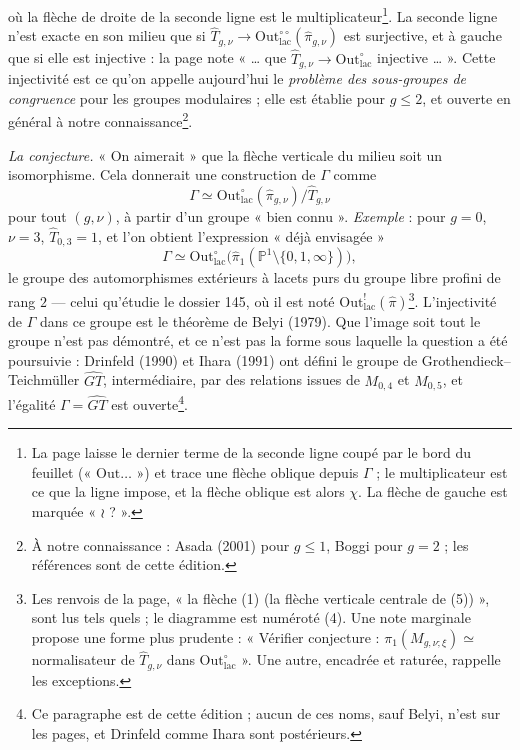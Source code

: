 \documentclass[11pt,a4paper]{article}
\begin{document}
où la flèche de droite de la seconde ligne est le multiplicateur\footnote{La
page laisse le dernier terme de la seconde ligne coupé par le bord du
feuillet (« $\mathrm{Out}\ldots$ ») et trace une flèche oblique depuis $\Gamma$ ;
le multiplicateur est ce que la ligne impose, et la flèche oblique est alors
$\chi$. La flèche de gauche est marquée « $\wr$ ? ».}. La seconde ligne n'est
exacte en son milieu que si $\widehat T_{g,\nu} \to
\mathrm{Out}^{\circ\circ}_{\mathrm{lac}}(\widehat\pi_{g,\nu})$ est surjective, et
à gauche que si elle est injective : la page note « … que $\widehat T_{g,\nu}
\to \mathrm{Out}^{\circ}_{\mathrm{lac}}$ injective … ». Cette injectivité est
ce qu'on appelle aujourd'hui le \emph{problème des sous-groupes de congruence}
pour les groupes modulaires ; elle est établie pour $g \leq 2$, et ouverte en
général à notre connaissance\footnote{À notre connaissance : Asada (2001) pour $g \leq 1$, Boggi pour
$g = 2$ ; les références sont de cette édition.}.

\emph{La conjecture.} « On aimerait » que la flèche verticale du milieu soit un
isomorphisme. Cela donnerait une construction de $\Gamma$ comme
\[
\Gamma \simeq \mathrm{Out}^{\circ}_{\mathrm{lac}}(\widehat\pi_{g,\nu}) \big/
\widehat T_{g,\nu}
\]
pour tout $(g, \nu)$, à partir d'un groupe « bien connu ». \emph{Exemple} : pour
$g = 0$, $\nu = 3$, $\widehat T_{0,3} = 1$, et l'on obtient l'expression « déjà
envisagée »
\[
\Gamma \simeq \mathrm{Out}^{\circ}_{\mathrm{lac}}\bigl(\widehat\pi_1(\mathbb{P}^1
\setminus \{0, 1, \infty\})\bigr),
\]
le groupe des automorphismes extérieurs à lacets purs du groupe libre profini
de rang $2$ — celui qu'étudie le dossier 145, où il est noté
$\mathrm{Out}^{!}_{\mathrm{lac}}(\widehat\pi)$\footnote{Les renvois de la page,
« la flèche (1) (la flèche verticale centrale de (5)) », sont lus tels quels ;
le diagramme est numéroté (4). Une note marginale propose une forme plus
prudente : « Vérifier conjecture : $\pi_1(M_{g,\nu;\xi}) \simeq$ normalisateur de
$\widehat T_{g,\nu}$ dans $\mathrm{Out}^{\circ}_{\mathrm{lac}}$ ». Une autre,
encadrée et raturée, rappelle les exceptions.}. L'injectivité de $\Gamma$
dans ce groupe est le théorème de Belyi (1979). Que l'image soit tout le groupe
n'est pas démontré, et ce n'est pas la forme sous laquelle la question a été
poursuivie : Drinfeld (1990) et Ihara (1991) ont défini le groupe de
Grothendieck--Teichmüller $\widehat{GT}$, intermédiaire, par des relations
issues de $M_{0,4}$ et $M_{0,5}$, et l'égalité $\Gamma = \widehat{GT}$ est
ouverte\footnote{Ce paragraphe est de cette édition ; aucun de ces noms, sauf
Belyi, n'est sur les pages, et Drinfeld comme Ihara sont postérieurs.}.
\end{document}
